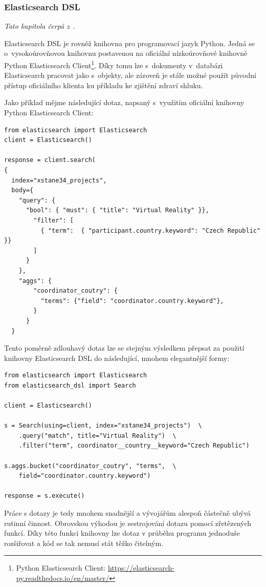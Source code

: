 \subsubsection*{Elasticsearch DSL}
\emph{Tato kapitola čerpá z~\cite{bib:elastic-dsl}}.

Elasticsearch DSL je rovněž knihovna pro programovací jazyk Python. Jedná se o~vysokoúrovňovou knihovnu postavenou na oficiální nízkoúrovňové knihovně Python Elasticsearch Client\footnote{Python Elasticsearch Client: \url{https://elasticsearch-py.readthedocs.io/en/master/}}. Díky tomu lze s~dokumenty v~databázi Elasticsearch pracovat jako s~objekty, ale zároveň je stále možné použít původní přístup oficiálního klienta ku příkladu ke zjištění zdraví shluku.

Jako příklad mějme následující dotaz, napsaný s~využitím oficiální knihovny Python Elasticsearch Client:
\begin{verbatim}
from elasticsearch import Elasticsearch
client = Elasticsearch()

response = client.search(
{
  index="xstane34_projects",
  body={
    "query": { 
      "bool": { "must": { "title": "Virtual Reality" }}, 
        "filter": [ 
          { "term":  { "participant.country.keyword": "Czech Republic" }}
        ]
      }
    },
    "aggs": {
        "coordinator_coutry": {
          "terms": {"field": "coordinator.country.keyword"},
        }
      }
  }
\end{verbatim}

Tento poměrně zdlouhavý dotaz lze se stejným výsledkem přepsat za použití knihovny Elasticsearch DSL do následující, mnohem elegantnější formy:

\begin{verbatim}
from elasticsearch import Elasticsearch
from elasticsearch_dsl import Search

client = Elasticsearch()

s = Search(using=client, index="xstane34_projects")  \
    .query("match", title="Virtual Reality")  \
    .filter("term", coordinator__country__keyword="Czech Republic")

s.aggs.bucket("coordinator_coutry", "terms",  \
    field="coordinator.country.keyword")

response = s.execute()
\end{verbatim}

Práce s dotazy je tedy mnohem snadnější a vývojářům alespoň částečně ubývá rutinní činnost. Obrovskou výhodou je sestrojování dotazu pomocí zřetězených funkcí. Díky této funkci knihovny lze dotaz v průběhu programu jednoduše rozšiřovat a kód se tak nemusí stát těžko čitelným.

